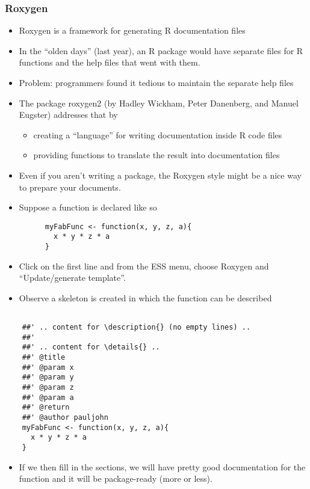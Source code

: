 \documentclass[11pt,english]{beamer}
\begin{document}
\begin{frame}
  \frametitle{Roxygen}
  \begin{itemize}
  \item Roxygen is a framework for generating R documentation files
  \item In the ``olden days'' (last year), an R package would have separate
    files for R functions and the help files that went with them.
  \item Problem: programmers found it tedious to maintain the separate help
    files
  \item The package roxygen2 (by Hadley Wickham, Peter Danenberg, and Manuel
    Eugster) addresses that by 

    \begin{itemize}
    \item creating a ``language'' for writing documentation inside R code
      files
    \item providing functions to translate the result into documentation files
    \end{itemize}
  \item Even if you aren't writing a package, the Roxygen style might be a
    nice way to prepare your documents. 
  \item Suppose a function is declared like so


    \begin{lstlisting}
      myFabFunc <- function(x, y, z, a){
        x * y * z * a
      }
    \end{lstlisting}


  \item Click on the first line and from the ESS menu, choose Roxygen and
    ``Update/generate template''. 
  \item Observe a skeleton is created in which the function can be described
  \end{itemize}
  \begin{lstlisting}[basicstyle={\small}]

    ##' .. content for \description{} (no empty lines) ..
    ##'
    ##' .. content for \details{} ..
    ##' @title 
    ##' @param x 
    ##' @param y 
    ##' @param z 
    ##' @param a 
    ##' @return 
    ##' @author pauljohn
    myFabFunc <- function(x, y, z, a){
      x * y * z * a
    }
  \end{lstlisting}

  \begin{itemize}
  \item If we then fill in the sections, we will have pretty good documentation
    for the function and it will be package-ready (more or less).
  \end{itemize}
\end{frame}
\end{document}
